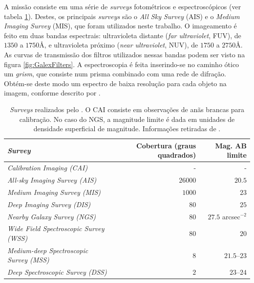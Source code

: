 A missão consiste em uma série de {\em surveys} fotométricos e espectroscópicos
(ver tabela \ref{tab:GalexSurveys}). Destes, os principais {\em surveys} são o
{\em All Sky Survey} (AIS) e o {\em Medium Imaging Survey} (MIS), que foram
utilizados neste trabalho. O imageamento é feito em duas bandas espectrais:
ultravioleta distante ({\em far ultraviolet}, FUV), de $1350$ a $1750$\AA, e
ultravioleta próximo ({\em near ultraviolet}, NUV), de $1750$ a $2750$\AA. As
curvas de transmissão dos filtros utilizados nessas bandas podem ser visto na
figura \ref{fig:GalexFilters}. A espectroscopia é feita inserindo-se no caminho
ótico um {\em grism}, que consiste num prisma combinado com uma rede de
difração. Obtém-se deste modo um espectro de baixa resolução para cada objeto na
imagem, conforme descrito por \citet{Morrissey2007}.

\begin{table}
	\caption[{\em Surveys} realizados pelo \galex.]{{\em Surveys} realizados pelo
	\galex. O CAI consiste em observações de anãs brancas para calibração. No caso
	do NGS, a magnitude limite é dada em unidades de densidade superficial de
	magnitude. Informações retiradas de \citet{Martin2005}.}
	\begin{tabular}{l r r}
		{\em Survey} & Cobertura (graus quadrados) & Mag. AB limite \\ 
		\midrule
		{\em Calibration Imaging (CAI)} & - & - \\
		{\em All-sky Imaging Survey (AIS)} & $26000$ & $20.5$ \\
		{\em Medium Imaging Survey (MIS)} & $1000$ & $23$ \\
		{\em Deep Imaging Survey (DIS)} & $80$ & $25$ \\
		{\em Nearby Galaxy Survey (NGS)} & $80$ & $27.5$ arcsec$^{-2}$  \\
		{\em Wide Field Spectroscopic Survey (WSS)} & $80$ & $20$ \\
		{\em Medium-deep Spectroscopic Survey (MSS)} & $8$ & $21.5$--$23$ \\
		{\em Deep Spectroscopic Survey (DSS)} & $2$ & $23$--$24$ \\
	\end{tabular}
	\label{tab:GalexSurveys}
\end{table}

